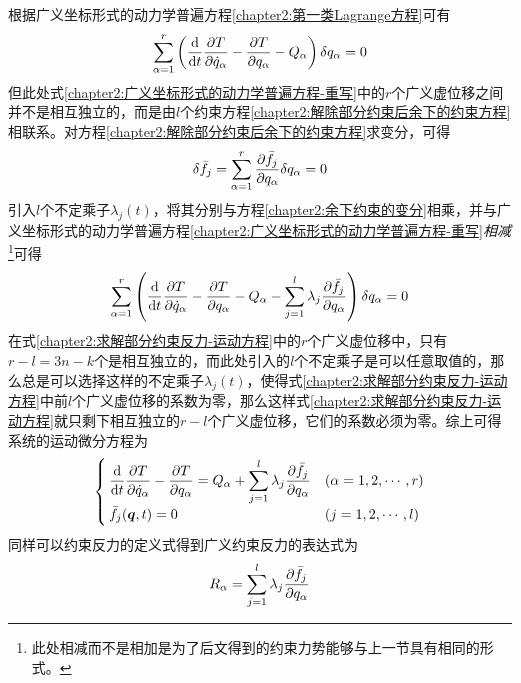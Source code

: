 根据广义坐标形式的动力学普遍方程\eqref{chapter2:第一类Lagrange方程}可有
\begin{equation}
	\sum_{\alpha=1}^r \left(\dfrac{\mathrm{d}}{\mathrm{d} t}\frac{\partial T}{\partial \dot{q}_\alpha} - \frac{\partial T}{\partial q_\alpha} - Q_\alpha\right)\delta q_\alpha = 0
	\label{chapter2:广义坐标形式的动力学普遍方程-重写}
\end{equation}
但此处式\eqref{chapter2:广义坐标形式的动力学普遍方程-重写}中的$r$个广义虚位移之间并不是相互独立的，而是由$l$个约束方程\eqref{chapter2:解除部分约束后余下的约束方程}相联系。对方程\eqref{chapter2:解除部分约束后余下的约束方程}求变分，可得
\begin{equation}
	\delta \bar{f}_j = \sum_{\alpha=1}^r \frac{\partial \bar{f}_j}{\partial q_\alpha} \delta q_\alpha = 0
	\label{chapter2:余下约束的变分}
\end{equation}
引入$l$个不定乘子$\lambda_j(t)$，将其分别与方程\eqref{chapter2:余下约束的变分}相乘，并与广义坐标形式的动力学普遍方程\eqref{chapter2:广义坐标形式的动力学普遍方程-重写}{\it 相减}\footnote{此处相减而不是相加是为了后文得到的约束力势能够与上一节具有相同的形式。}可得
\begin{equation}
	\sum_{\alpha=1}^r \left(\frac{\mathrm{d}}{\mathrm{d} t} \frac{\partial T}{\partial \dot{q}_\alpha} - \frac{\partial T}{\partial q_\alpha} - Q_\alpha - \sum_{j=1}^l \lambda_j \frac{\partial \bar{f}_j}{\partial q_\alpha} \right) \delta q_\alpha = 0
	\label{chapter2:求解部分约束反力-运动方程}
\end{equation}
在式\eqref{chapter2:求解部分约束反力-运动方程}中的$r$个广义虚位移中，只有$r-l=3n-k$个是相互独立的，而此处引入的$l$个不定乘子是可以任意取值的，那么总是可以选择这样的不定乘子$\lambda_j(t)$，使得式\eqref{chapter2:求解部分约束反力-运动方程}中前$l$个广义虚位移的系数为零，那么这样式\eqref{chapter2:求解部分约束反力-运动方程}就只剩下相互独立的$r-l$个广义虚位移，它们的系数必须为零。综上可得系统的运动微分方程为
\begin{equation}
\begin{cases}
	\displaystyle \frac{\mathrm{d}}{\mathrm{d} t} \frac{\partial T}{\partial \dot{q}_\alpha} - \frac{\partial T}{\partial q_\alpha} = Q_\alpha + \sum_{j=1}^l \lambda_j \frac{\partial \bar{f}_j}{\partial q_\alpha} & (\alpha=1,2,\cdots,r) \\
	\bar{f}_j(\boldsymbol{q},t) = 0 & (j=1,2,\cdots,l)
\end{cases}
\label{chapter2:求解理想完整系统的部分约束反力}
\end{equation}
同样可以约束反力的定义式得到广义约束反力的表达式为
\begin{equation}
	R_\alpha = \sum_{j=1}^l \lambda_j \frac{\partial \bar{f}_j}{\partial q_\alpha}
\end{equation}
